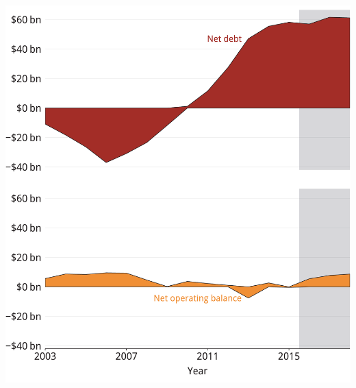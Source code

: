 \documentclass[tikz]{standalone}\usepackage[]{graphicx}\usepackage[]{color}
\newenvironment{knitrout}{}{} %
\begin{document}
\begin{knitrout}
\color{fgcolor}
\includegraphics[width=11.000in,height=12in]{./b5-figure/FISCAL-Figure12-1} 

\end{knitrout}
\end{document}
